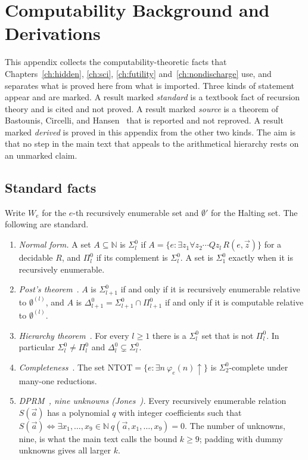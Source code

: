 \chapter{Computability Background and Derivations}
\label{app:computability}

This appendix collects the computability-theoretic facts that Chapters~\ref{ch:hidden}, \ref{ch:sci}, \ref{ch:futility} and~\ref{ch:nondischarge} use, and separates what is proved here from what is imported. Three kinds of statement appear and are marked. A result marked \emph{standard} is a textbook fact of recursion theory and is cited and not proved. A result marked \emph{source} is a theorem of Bastounis, Circelli, and Hansen~\cite{BCH26} that is reported and not reproved. A result marked \emph{derived} is proved in this appendix from the other two kinds. The aim is that no step in the main text that appeals to the arithmetical hierarchy rests on an unmarked claim.

\section{Standard facts}

Write $W_e$ for the $e$-th recursively enumerable set and $\emptyset'$ for the Halting set. The following are standard.

\begin{enumerate}[label=(S\arabic*), leftmargin=2.6em]
\item \emph{Normal form.} A set $A\subseteq\mathbb{N}$ is $\Sigma^0_l$ if $A=\{e:\exists z_1\forall z_2\cdots Q z_l\,R(e,\vec z)\}$ for a decidable $R$, and $\Pi^0_l$ if its complement is $\Sigma^0_l$. A set is $\Sigma^0_1$ exactly when it is recursively enumerable.
\item \emph{Post's theorem}~\cite{Soare87,Rogers67}. $A$ is $\Sigma^0_{l+1}$ if and only if it is recursively enumerable relative to $\emptyset^{(l)}$, and $A$ is $\Delta^0_{l+1}=\Sigma^0_{l+1}\cap\Pi^0_{l+1}$ if and only if it is computable relative to $\emptyset^{(l)}$.
\item \emph{Hierarchy theorem}~\cite{Soare87}. For every $l\ge1$ there is a $\Sigma^0_l$ set that is not $\Pi^0_l$. In particular $\Sigma^0_l\neq\Pi^0_l$ and $\Delta^0_l\subsetneq\Sigma^0_l$.
\item \emph{Completeness}~\cite{Soare87}. The set $\mathrm{NTOT}=\{e:\exists n\ \varphi_e(n)\uparrow\}$ is $\Sigma^0_2$-complete under many-one reductions.
\item \emph{DPRM}~\cite{DPR61,Matiyasevich70}\emph{, nine unknowns (Jones}~\cite{Jones82}\emph{).} Every recursively enumerable relation $S(\vec a)$ has a polynomial $q$ with integer coefficients such that $S(\vec a)\iff\exists x_1,\dots,x_9\in\mathbb{N}\ q(\vec a,x_1,\dots,x_9)=0$. The number of unknowns, nine, is what the main text calls the bound $k\ge9$; padding with dummy unknowns gives all larger $k$.
\end{enumerate}

